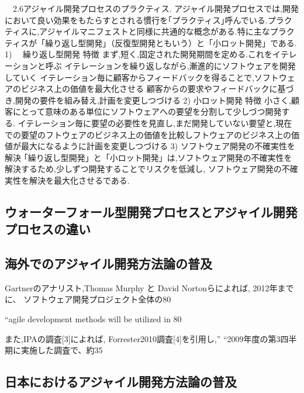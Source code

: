 \documentclass[paper]{jrsj}
\begin{document}
　2.6アジャイル開発プロセスのプラクティス.
アジャイル開発プロセスでは,開発において良い効果をもたらすとされる慣行を｢プラクティス｣呼んでいる.プラクティスに,アジャイルマニフェストと同様に共通的な概念がある.特に主なプラクティスが「繰り返し型開発」（反復型開発ともいう）と「小ロット開発」である.
1)　 繰り返し型開発
	特徴
	まず,短く,固定された開発期間を定める.これをイテレーションと呼ぶ
	イテレーションを繰り返しながら,漸進的にソフトウェアを開発していく
	イテレーション毎に顧客からフィードバックを得ることで,ソフトウェアのビジネス上の価値を最大化させる
	顧客からの要求やフィードバックに基づき,開発の要件を組み替え,計画を変更しつづける
2)	小ロット開発
	特徴
	小さく,顧客にとって意味のある単位にソフトウェアへの要望を分割して少しづつ開発する.
	イテレーション毎に要望の必要性を見直し,まだ開発していない要望と,現在での要望のフトウェアのビジネス上の価値を比較しフトウェアのビジネス上の価値が最大になるように計画を変更しつづける
3)	ソフトウェア開発の不確実性を解決
｢繰り返し型開発」と「小ロット開発」は,ソフトウェア開発の不確実性を解決するため,少しずつ開発することでリスクを低減し, ソフトウェア開発の不確実性を解決を最大化させるである.

\subsection{ウォーターフォール型開発プロセスとアジャイル開発プロセスの違い}

\subsection{海外でのアジャイル開発方法論の普及}
Gartnerのアナリスト,Thomas Murphy と David Nortonらによれば, 2012年までに、
ソフトウェア開発プロジェクト全体の80%

“agile development methods will be utilized in 80%

また,IPAの調査[3]によれば, Forrester2010調査[4]を引用し,” “2009年度の第3四半期に実施した調査で、約35%

\subsection{日本におけるアジャイル開発方法論の普及}
\end{document}
